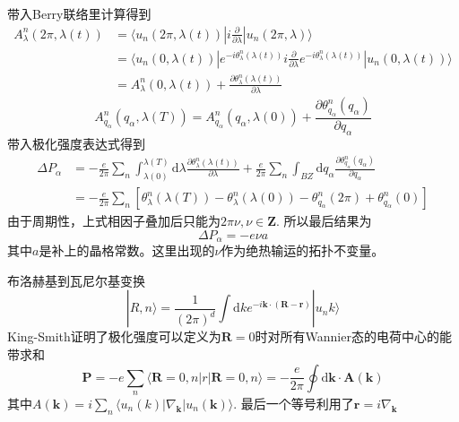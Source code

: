 \documentclass{article}
\numberwithin{equation}{subsection}
\begin{document}
带入Berry联络里计算得到
\begin{equation}
    \begin{split}
        A_\lambda^n(2\pi,\lambda(t))&=\langle u_n(2\pi,\lambda(t))|i\frac{\partial}{\partial\lambda}|u_n(2\pi,\lambda)\rangle\\
        &=\langle u_n(0,\lambda(t))|e^{-i\theta_\lambda^n(\lambda(t))}i\frac{\partial}{\partial\lambda}e^{-i\theta_\lambda^n(\lambda(t))}|u_n(0,\lambda(t))\rangle\\
        &=A_\lambda^n(0,\lambda(t))+\frac{\partial\theta_\lambda^n(\lambda(t))}{\partial \lambda}
    \end{split}
\end{equation}
\begin{equation}
    A_{q_\alpha}^n(q_\alpha,\lambda(T))=A_{q_\alpha}^n(q_\alpha,\lambda(0))+\frac{\partial\theta_{q_\alpha}^n(q_\alpha)}{\partial q_\alpha}
\end{equation}
带入极化强度表达式得到
\begin{equation}
    \begin{split}
        \Delta P_\alpha&=-\frac{e}{2\pi}\sum_{n}\int_{\lambda(0)}^{\lambda(T)}\mathrm{d}\lambda\frac{\partial\theta_\lambda^n(\lambda(t))}{\partial\lambda}+\frac{e}{2\pi}\sum_{n}\int_{BZ}\mathrm{d}q_\alpha\frac{\partial \theta_{q_\alpha}^n(q_\alpha)}{\partial q_\alpha}\\
        &=-\frac{e}{2\pi}\sum_{n}[\theta_\lambda^n(\lambda(T))-\theta_\lambda^n(\lambda(0))-\theta_{q_\alpha}^n(2\pi)+\theta_{q_\alpha}^n(0)]
    \end{split}
\end{equation}
由于周期性，上式相因子叠加后只能为$2\pi\nu,\nu\in\mathbf{Z}$. 所以最后结果为
\begin{equation}
    \Delta P_\alpha=-e\nu a
\end{equation}
其中$a$是补上的晶格常数。这里出现的$\nu$作为绝热输运的拓扑不变量。

布洛赫基到瓦尼尔基变换
\begin{equation}
    |R,n\rangle=\frac{1}{(2\pi)^d}\int \mathrm{d}ke^{-i\mathbf{k}\cdot(\mathbf{R}-\mathbf{r})}|u_n{k}\rangle
\end{equation}
King-Smith证明了极化强度可以定义为$\mathbf{R}=0$时对所有Wannier态的电荷中心的能带求和
\begin{equation}
    \mathbf{P}=-e\sum_{n}\langle\mathbf{R}=0,n|r|\mathbf{R}=0,n\rangle=-\frac{e}{2\pi}\oint\mathrm{d}\mathbf{k}\cdot \mathbf{A}(\mathbf{k})
\end{equation}
其中$A(\mathbf{k})=i\sum_{n}\langle u_n(k)|\nabla_{\mathbf{k}}|u_n(\mathbf{k})\rangle$. 最后一个等号利用了$\mathbf{r}=i\nabla_{\mathbf{k}}$
\end{document}
